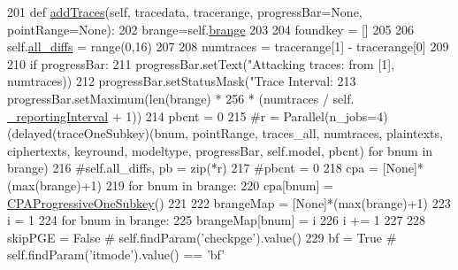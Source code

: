 \begin{DoxyCode}
201     \textcolor{keyword}{def }\hyperlink{classsoftware_1_1chipwhisperer_1_1analyzer_1_1attacks_1_1cpa__algorithms_1_1progressive__caccel_1_1CPAProgressive__CAccel_a4a13be84224739e5ec306b6d45837fed}{addTraces}(self, tracedata, tracerange, progressBar=None, pointRange=None):
202         brange=self.\hyperlink{classsoftware_1_1chipwhisperer_1_1analyzer_1_1attacks_1_1cpa__algorithms_1_1progressive__caccel_1_1CPAProgressive__CAccel_a11fa06dd5d4fb9ad43dfd86c99d4bc9c}{brange}
203 
204         foundkey = []
205 
206         self.\hyperlink{classsoftware_1_1chipwhisperer_1_1analyzer_1_1attacks_1_1cpa__algorithms_1_1progressive__caccel_1_1CPAProgressive__CAccel_a4e9d37e4a284dc33de07bc3c89a1c0a7}{all\_diffs} = range(0,16)
207 
208         numtraces = tracerange[1] - tracerange[0]
209 
210         \textcolor{keywordflow}{if} progressBar:
211             progressBar.setText(\textcolor{stringliteral}{"Attacking traces: from %
      [1], numtraces))
212             progressBar.setStatusMask(\textcolor{stringliteral}{"Trace Interval: %
213             progressBar.setMaximum(len(brange) * 256 * (numtraces / self.
      \hyperlink{classsoftware_1_1chipwhisperer_1_1analyzer_1_1attacks_1_1cpa__algorithms_1_1progressive__caccel_1_1CPAProgressive__CAccel_aeeada041496f41516cf4b3effe6a8b36}{\_reportingInterval} + 1))
214         pbcnt = 0
215         \textcolor{comment}{#r = Parallel(n\_jobs=4)(delayed(traceOneSubkey)(bnum, pointRange, traces\_all, numtraces,
       plaintexts, ciphertexts, keyround, modeltype, progressBar, self.model, pbcnt) for bnum in brange)}
216         \textcolor{comment}{#self.all\_diffs, pb = zip(*r)}
217         \textcolor{comment}{#pbcnt = 0}
218         cpa = [\textcolor{keywordtype}{None}]*(max(brange)+1)
219         \textcolor{keywordflow}{for} bnum \textcolor{keywordflow}{in} brange:
220             cpa[bnum] = \hyperlink{classsoftware_1_1chipwhisperer_1_1analyzer_1_1attacks_1_1cpa__algorithms_1_1progressive__caccel_1_1CPAProgressiveOneSubkey}{CPAProgressiveOneSubkey}()
221 
222         brangeMap = [\textcolor{keywordtype}{None}]*(max(brange)+1)
223         i = 1
224         \textcolor{keywordflow}{for} bnum \textcolor{keywordflow}{in} brange:
225             brangeMap[bnum] = i
226             i += 1
227 
228         skipPGE = \textcolor{keyword}{False}  \textcolor{comment}{# self.findParam('checkpge').value()}
229         bf = \textcolor{keyword}{True}  \textcolor{comment}{# self.findParam('itmode').value() == 'bf'}
}}
\end{DoxyCode}
